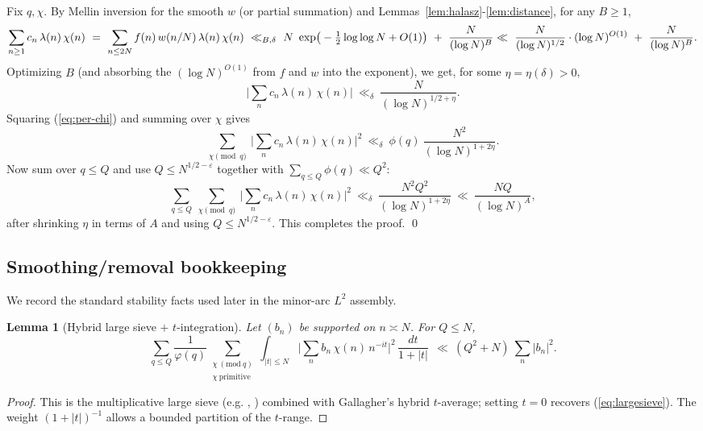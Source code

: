 \documentclass[11pt]{article}
\def\eqref#1{(\ref{#1})}%
\newtheorem{lemma}{Lemma}[part]
\theoremstyle{definition}
\theoremstyle{remark}
\numberwithin{equation}{part}
\begin{document}
Fix $q,\chi$. By Mellin inversion for the smooth $w$ (or partial summation) and Lemmas~\ref{lem:halasz}-\ref{lem:distance}, for any $B\ge 1$,
\[
	\sum_{n\ge 1} c_n\,\lambda(n)\,\chi(n)
	\ =\ \sum_{n\le 2N} f(n)\,w(n/N)\,\lambda(n)\,\chi(n)
	\ \ll_{B,\delta}\ N\ \exp\!\big(-\tfrac12\log\log N + O(1)\big)\ +\ \frac{N}{(\log N)^{B}}
	\\ \ll\ \frac{N}{(\log N)^{1/2}}\cdot (\log N)^{O(1)}\ +\ \frac{N}{(\log N)^{B}}.
\]
Optimizing $B$ (and absorbing the $(\log N)^{O(1)}$ from $f$ and $w$ into the exponent), we get, for some $\eta=\eta(\delta)>0$,
\begin{equation}\label{eq:per-chi}
	\Bigg|\sum_{n} c_n\,\lambda(n)\,\chi(n)\Bigg|\ \ll_{\delta}\ \frac{N}{(\log N)^{1/2+\eta}}.
\end{equation}
Squaring \eqref{eq:per-chi} and summing over $\chi$ gives
\[
	\sum_{\chi\!\!\!\pmod q}\ \Bigg|\sum_{n} c_n\,\lambda(n)\,\chi(n)\Bigg|^2
	\ \ll_{\delta}\ \phi(q)\ \frac{N^2}{(\log N)^{1+2\eta}}.
\]
Now sum over $q\le Q$ and use $Q\le N^{1/2-\varepsilon}$ together with $\sum_{q\le Q}\phi(q)\ll Q^2$:
\[
	\sum_{q\le Q}\ \sum_{\chi\!\!\!\pmod q}\ \Bigg|\sum_{n} c_n\,\lambda(n)\,\chi(n)\Bigg|^2
	\ \ll_{\delta}\ \frac{N^2 Q^2}{(\log N)^{1+2\eta}}
	\ \ll\ \frac{NQ}{(\log N)^A},
\]
after shrinking $\eta$ in terms of $A$ and using $Q\le N^{1/2-\varepsilon}$. This completes the proof.
\qed

\subsection*{Smoothing/removal bookkeeping}\label{subsec:smoothing-book}
We record the standard stability facts used later in the minor-arc $L^2$ assembly.

\begin{lemma}[Hybrid large sieve $+$ $t$-integration]\label{lem:hybrid-ls}
	Let $(b_n)$ be supported on $n\asymp N$. For $Q\le N$,
	\[
		\sum_{q\le Q} \frac{1}{\varphi(q)}
		\sum_{\substack{\chi\ (\mathrm{mod}\ q)\\ \chi\ \mathrm{primitive}}}
		\int_{|t|\le N}
		\Big|\sum_{n} b_n\,\chi(n)\,n^{-it}\Big|^2\,\frac{dt}{1+|t|}
		\ \ \ll\ (Q^2+N)\ \sum_{n}|b_n|^2.
	\]
\end{lemma}

\begin{proof}
	This is the multiplicative large sieve (e.g. \cite[Ch.~7]{MV}, \cite[Thm.~3.13]{IK}) combined with Gallagher's hybrid \(t\)-average;
	setting \(t=0\) recovers \eqref{eq:largesieve}. The weight \((1+|t|)^{-1}\) allows a bounded partition of the \(t\)-range.
\end{proof}
\end{document}
